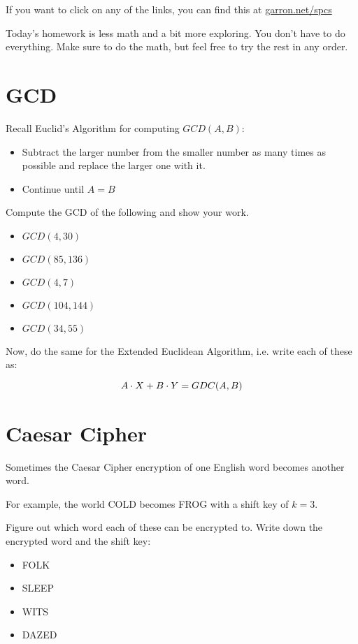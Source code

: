 \documentclass[12pt]{article}
\begin{document}
 

If you want to click on any of the links, you can find this at \href{https://garron.net/spcs/}{garron.net/spcs}

Today's homework is less math and a bit more exploring. You don't have to do everything. Make sure to do the math, but feel free to try the rest in any order.


\section{GCD}


Recall Euclid's Algorithm for computing $GCD(A, B)$:

\begin{itemize}
\item Subtract the larger number from the smaller number as many times as possible and replace the larger one with it.
\item Continue until $A = B$
\end{itemize}

Compute the GCD of the following and show your work.

\begin{itemize}
\item $GCD(4, 30)$
\item $GCD(85, 136)$
\item $GCD(4, 7)$
\item $GCD(104, 144)$
\item $GCD(34, 55)$
\end{itemize}

Now, do the same for the Extended Euclidean Algorithm, i.e. write each of these as:

$$
A \cdot X + B \cdot Y = GDC(A, B)
$$

\section{Caesar Cipher}

Sometimes the Caesar Cipher encryption of one English word becomes another word.

For example, the world COLD becomes FROG with a shift key of $k = 3$.

Figure out which word each of these can be encrypted to. Write down the encrypted word and the shift key:

\begin{itemize}
\item FOLK 
\item SLEEP 
\item WITS 
\item DAZED 
\end{itemize}
\end{document}
